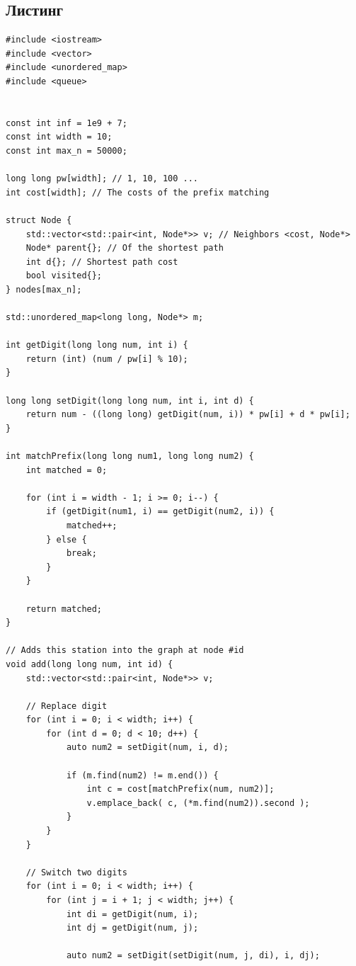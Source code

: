 \documentclass[a5paper, 10pt]{article}
\theoremstyle{definition}
\theoremstyle{plain}
\theoremstyle{remark}
\begin{document}
\subsection{Листинг}

\begin{center}
\begin{lstlisting}[label=some-code,caption={Исходный код для 1806}]
#include <iostream>
#include <vector>
#include <unordered_map>
#include <queue>


const int inf = 1e9 + 7;
const int width = 10;
const int max_n = 50000;

long long pw[width]; // 1, 10, 100 ...
int cost[width]; // The costs of the prefix matching

struct Node {
    std::vector<std::pair<int, Node*>> v; // Neighbors <cost, Node*>
    Node* parent{}; // Of the shortest path
    int d{}; // Shortest path cost
    bool visited{};
} nodes[max_n];

std::unordered_map<long long, Node*> m;

int getDigit(long long num, int i) {
    return (int) (num / pw[i] % 10);
}

long long setDigit(long long num, int i, int d) {
    return num - ((long long) getDigit(num, i)) * pw[i] + d * pw[i];
}

int matchPrefix(long long num1, long long num2) {
    int matched = 0;

    for (int i = width - 1; i >= 0; i--) {
        if (getDigit(num1, i) == getDigit(num2, i)) {
            matched++;
        } else {
            break;
        }
    }

    return matched;
}

// Adds this station into the graph at node #id
void add(long long num, int id) {
    std::vector<std::pair<int, Node*>> v;

    // Replace digit
    for (int i = 0; i < width; i++) {
        for (int d = 0; d < 10; d++) {
            auto num2 = setDigit(num, i, d);

            if (m.find(num2) != m.end()) {
                int c = cost[matchPrefix(num, num2)];
                v.emplace_back( c, (*m.find(num2)).second );
            }
        }
    }

    // Switch two digits
    for (int i = 0; i < width; i++) {
        for (int j = i + 1; j < width; j++) {
            int di = getDigit(num, i);
            int dj = getDigit(num, j);

            auto num2 = setDigit(setDigit(num, j, di), i, dj);


\end{lstlisting}
\end{center}
\end{document}
